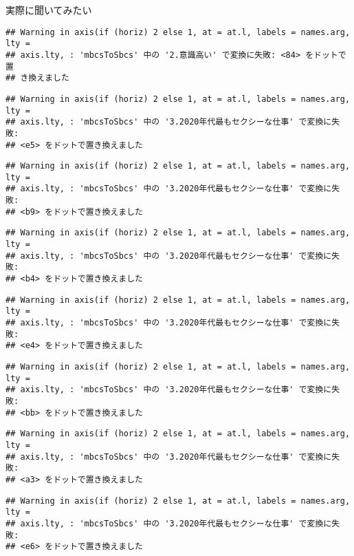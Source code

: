 \documentclass[ignorenonframetext,]{beamer}
\begin{document}
\begin{frame}[fragile]{実際に聞いてみたい}
\begin{verbatim}
## Warning in axis(if (horiz) 2 else 1, at = at.l, labels = names.arg, lty =
## axis.lty, : 'mbcsToSbcs' 中の '2.意識高い' で変換に失敗: <84> をドットで置
## き換えました
\end{verbatim}

\begin{verbatim}
## Warning in axis(if (horiz) 2 else 1, at = at.l, labels = names.arg, lty =
## axis.lty, : 'mbcsToSbcs' 中の '3.2020年代最もセクシーな仕事' で変換に失敗:
## <e5> をドットで置き換えました
\end{verbatim}

\begin{verbatim}
## Warning in axis(if (horiz) 2 else 1, at = at.l, labels = names.arg, lty =
## axis.lty, : 'mbcsToSbcs' 中の '3.2020年代最もセクシーな仕事' で変換に失敗:
## <b9> をドットで置き換えました
\end{verbatim}

\begin{verbatim}
## Warning in axis(if (horiz) 2 else 1, at = at.l, labels = names.arg, lty =
## axis.lty, : 'mbcsToSbcs' 中の '3.2020年代最もセクシーな仕事' で変換に失敗:
## <b4> をドットで置き換えました
\end{verbatim}

\begin{verbatim}
## Warning in axis(if (horiz) 2 else 1, at = at.l, labels = names.arg, lty =
## axis.lty, : 'mbcsToSbcs' 中の '3.2020年代最もセクシーな仕事' で変換に失敗:
## <e4> をドットで置き換えました
\end{verbatim}

\begin{verbatim}
## Warning in axis(if (horiz) 2 else 1, at = at.l, labels = names.arg, lty =
## axis.lty, : 'mbcsToSbcs' 中の '3.2020年代最もセクシーな仕事' で変換に失敗:
## <bb> をドットで置き換えました
\end{verbatim}

\begin{verbatim}
## Warning in axis(if (horiz) 2 else 1, at = at.l, labels = names.arg, lty =
## axis.lty, : 'mbcsToSbcs' 中の '3.2020年代最もセクシーな仕事' で変換に失敗:
## <a3> をドットで置き換えました
\end{verbatim}

\begin{verbatim}
## Warning in axis(if (horiz) 2 else 1, at = at.l, labels = names.arg, lty =
## axis.lty, : 'mbcsToSbcs' 中の '3.2020年代最もセクシーな仕事' で変換に失敗:
## <e6> をドットで置き換えました
\end{verbatim}


\end{frame}
\end{document}
